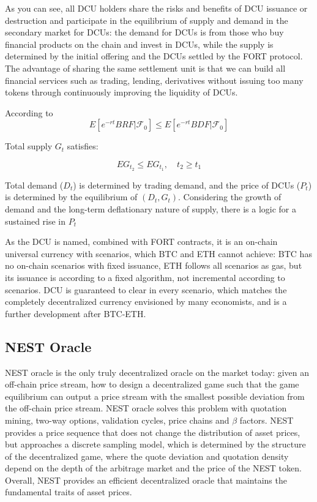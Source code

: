 \documentclass[letterpaper,12pt]{article}
\begin{document}
As you can see, all DCU holders share the risks and benefits of DCU issuance or destruction and participate in the equilibrium of supply and demand in the secondary market for DCUs: the demand for DCUs is from those who buy financial products on the chain and invest in DCUs, while the supply is determined by the initial offering and the DCUs settled by the FORT protocol. The advantage of sharing the same settlement unit is that we can build all financial services such as trading, lending, derivatives without issuing too many tokens through continuously improving the liquidity of DCUs.

According to
\begin{equation}
E\left[e^{-rt}BRF|\mathcal{F}_0\right] \leq E\left[e^{-rt}BDF|\mathcal{F}_0\right] 
\end{equation}

Total supply $G_t$ satisfies: 

\begin{equation} 
EG_{t_2} \leq EG_{t_1}, \quad t_2 \geq t_1 
\end{equation}

Total demand ($D_t$) is determined by trading demand, and the price of DCUs ($P_t$) is determined by the equilibrium of $(D_t, G_t)$. 
Considering the growth of demand and the long-term deflationary nature of supply, there is a logic for a sustained rise in $P_t$

As the DCU is named, combined with FORT contracts, it is an on-chain universal currency with scenarios, which BTC and ETH cannot achieve: BTC has no on-chain scenarios with fixed issuance, ETH follows all scenarios as gas, but its issuance is according to a fixed algorithm, not incremental according to scenarios. DCU is guaranteed to clear in every scenario, which matches the completely decentralized currency envisioned by many economists, and is a further development after BTC-ETH.

\subsection{NEST Oracle}

NEST oracle is the only truly decentralized oracle on the market today: given an off-chain price stream, how to design a decentralized game such that the game equilibrium can output a price stream with the smallest possible deviation from the off-chain price stream. NEST oracle solves this problem with quotation mining, two-way options, validation cycles, price chains and $\beta$ factors.
NEST provides a price sequence that does not change the distribution of asset prices, but approaches a discrete sampling model, which is determined by the structure of the decentralized game, where the quote deviation and quotation density depend on the depth of the arbitrage market and the price of the NEST token. Overall, NEST provides an efficient decentralized oracle that maintains the fundamental traits of asset prices.
\end{document}
